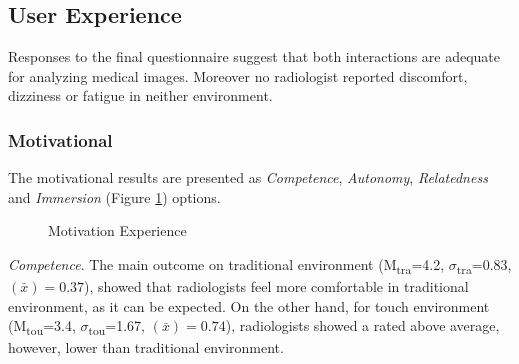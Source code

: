 \documentclass{chi-ext}
\begin{document}
\subsection{User Experience}

Responses to the final questionnaire suggest that both interactions are adequate for analyzing medical images. Moreover no radiologist reported discomfort, dizziness or fatigue in neither environment.

\subsubsection{Motivational}

The motivational results are presented as \textit{Competence}, \textit{Autonomy}, \textit{Relatedness} and \textit{Immersion} (Figure \ref{fig:Fig10}) options.

\begin{figure}
\caption{Motivation Experience}
\label{fig:Fig10}
\end{figure}

\textit{Competence}. The main outcome on traditional environment (M\textsubscript{tra}=4.2, $\sigma$\textsubscript{tra}=0.83, {}$\left({\bar x}\right)=0.37$), showed that radiologists feel more comfortable in traditional environment, as it can be expected. On the other hand, for touch environment (M\textsubscript{tou}=3.4, $\sigma$\textsubscript{tou}=1.67, {}$\left({\bar x}\right)=0.74$), radiologists showed a rated above average, however, lower than traditional environment.
\end{document}
